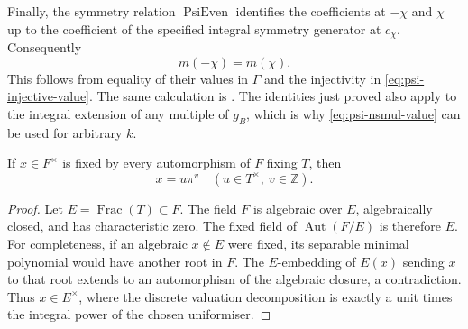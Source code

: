 Finally, the symmetry relation \(\operatorname{PsiEven}\) identifies
the coefficients at \(-\chi\) and \(\chi\) up to the coefficient of the
specified integral symmetry generator at \(c_\chi\).
Consequently
\[
                         m(-\chi)=m(\chi).
 \tag{PU6}\label{eq:psi-even-value}
\]
This follows from equality of their values in \(\Gamma\) and the
injectivity in \eqref{eq:psi-injective-value}.  The same calculation is
.  The identities just proved also apply to the integral
extension of any multiple of \(g_B\), which is why
\eqref{eq:psi-nsmul-value} can be used for arbitrary \(k\).

\begin{srlemma}
\label{lem:psi-fixed-field}
If \(x\in F^\times\) is fixed by every automorphism of \(F\) fixing
\(T\), then
\[
                          x=u\pi^v
                  \quad (u\in T^\times,\ v\in\mathbb Z).
\]
\end{srlemma}
\begin{proof}
Let \(E=\operatorname{Frac}(T)\subset F\).
The field \(F\) is algebraic over \(E\), algebraically closed, and has
characteristic zero.  The fixed field of
\(\operatorname{Aut}(F/E)\) is therefore \(E\).
For completeness, if an algebraic \(x\notin E\) were fixed, its
separable minimal polynomial would have another root in \(F\).
The \(E\)-embedding of \(E(x)\) sending \(x\) to that root extends to an
automorphism of the algebraic closure, a contradiction.
Thus \(x\in E^\times\), where the discrete valuation decomposition is
exactly a unit times the integral power of the chosen uniformiser.
\end{proof}

